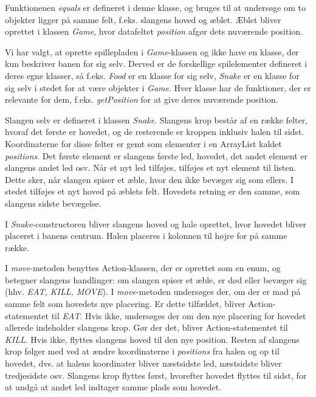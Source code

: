 Funktionenen \textit{equals} er defineret i denne klasse, og bruges til at undersøge om to objekter ligger på samme felt, f.eks. slangens hoved og æblet. Æblet bliver oprettet i klassen \textit{Game}, hvor datafeltet \textit{position} afgør dets nuværende position.

Vi har valgt, at oprette spillepladen i \textit{Game}-klassen og ikke have en klasse, der kun beskriver banen for sig selv. Derved er de forskellige spilelementer defineret i deres egne klasser, så f.eks. \textit{Food} er en klasse for sig selv, \textit{Snake} er en klasse for sig selv i stedet for at være objekter i \textit{Game}. Hver klasse har de funktioner, der er relevante for dem, f.eks. \textit{getPosition} for at give deres nuværende position. 

Slangen selv er defineret i klassen \textit{Snake}. Slangens krop består af en række felter, hvoraf det første er hovedet, og de resterende er kroppen inklusiv halen til sidst. Koordinaterne for disse felter er gemt som elementer i en ArrayList kaldet \textit{positions}. Det første element er slangens første led, hovedet, det andet element er slangens andet led osv. Når et nyt led tilføjes, tilføjes et nyt element til listen. Dette sker, når slangen spiser et æble, hvor den ikke bevæger sig som ellers. I stedet tilføjes et nyt hoved på æblets felt. Hovedets retning er den samme, som slangens sidste bevægelse.

I \textit{Snake}-constructoren bliver slangens hoved og hale oprettet, hvor hovedet bliver placeret i banens centrum. Halen placeres i kolonnen til højre for på samme række.

I \textit{move}-metoden benyttes Action-klassen, der er oprettet som en enum, og betegner slangens handlinger: om slangen spiser et æble, er død eller bevæger sig (hhv. \textit{EAT, KILL, MOVE}). I \textit{move}-metoden undersøges der, om der er mad på samme felt som hovedets nye placering. Er dette tilfældet, bliver Action-statementet til \textit{EAT}. Hvis ikke, undersøges der om den nye placering for hovedet allerede indeholder slangens krop. Gør der det, bliver Action-statementet til \textit{KILL}. Hvis ikke, flyttes slangens hoved til den nye position. Resten af slangens krop følger med ved at ændre koordinaterne i \textit{positions} fra halen og op til hovedet, dvs. at halens koordinater bliver næstsidste led, næstsidste bliver tredjesidste osv. Slangens krop flyttes først, hvorefter hovedet flyttes til sidst, for at undgå at andet led indtager samme plads som hovedet.

